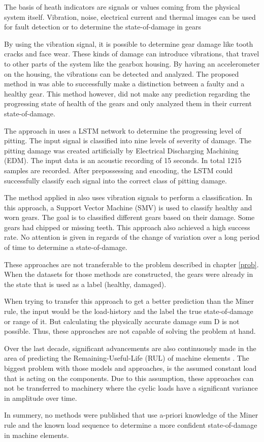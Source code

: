 The basis of heath indicators are signals or values coming from the physical system itself. Vibration, noise, electrical current and thermal images can be used for fault detection or to determine the state-of-damage in gears \cite{Prav,KaraACUSTIC,Medina,Kara}

By using the vibration signal, it is possible to determine gear damage like tooth cracks and face wear. These kinds of damage can introduce vibrations, that travel to other parts of the system like the gearbox housing. By having an accelerometer on the housing, the vibrations can be detected and analyzed. The proposed method in \cite{Prav} was able to successfully make a distinction between a faulty and a healthy gear. This method however, did not make any prediction regarding the progressing state of health of the gears and only analyzed them in their current state-of-damage. 

The approach in \cite{Medina} uses a LSTM network to determine the progressing level of pitting. The input signal is classified into nine levels of severity of damage. The pitting damage was created artificially by Electrical Discharging Machining (EDM). The input data is an acoustic recording of 15 seconds. In total 1215 samples are recorded. After prepossessing and encoding, the LSTM could successfully classify each signal into the correct class of pitting damage.

The method applied in \cite{RTiwari} also uses vibration signals to perform a classification. In this approach, a Support Vector Machine (SMV) is used to classify healthy and worn gears. The goal is to classified different gears based on their damage. Some gears had chipped or missing teeth. This approach also achieved a high success rate. No attention is given in regards of the change of variation over a long period of time to determine a state-of-damage. 


These approaches are not transferable to the problem described in chapter \ref{prob}. When the datasets for those methods are constructed, the gears were already in the state that is used as a label (healthy, damaged).

When trying to transfer this approach to get a better prediction than the Miner rule, the input would be the load-history and the label the true state-of-damage or range of it. But calculating the physically accurate damage sum D is not possible. Thus, these approaches are not capable of solving the problem at hand. 

Over the last decade, significant advancements are also continuously made in the area of predicting the Remaining-Useful-Life (RUL) of machine elements \cite{Deutsch,He,Yan}.
The biggest problem with those models and approaches, is the assumed constant load that is acting on the components. Due to this assumption, these approaches can not be transferred to machinery where the cyclic loads have a significant variance in amplitude over time.  

In summery, no methods were published that use a-priori knowledge of the Miner rule and the known load sequence to determine a more confident state-of-damage in machine elements.

